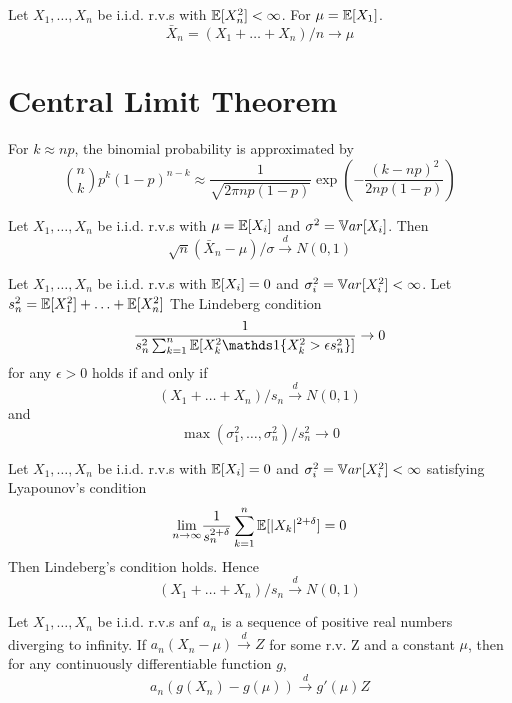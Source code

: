 \documentclass[11pt]{article}
\begin{document}
\theorem
Let $X_1, \hdots, X_n$ be i.i.d. r.v.s with $\mathbb{E}[{X_n^2}] < \infty$. For $\mu = \mathbb{E}[{X_1}]$. $$\bar{X}_n = (X_1 + \hdots + X_n) / n \rightarrow \mu$$ 

\section{Central Limit Theorem}
For $k \approx np$, the binomial probability is approximated by
$${n \choose k}p^k(1-p)^{n-k} \approx \frac{1}{\sqrt{2\pi np(1-p)}}\exp{\left ( - \frac{(k - np)^2}{2np(1-p)}\right)}$$

Let $X_1, \hdots, X_n$ be i.i.d. r.v.s with $\mu = \mathbb{E}[{X_i}]$ and $\sigma^2 = \mathbb{V}ar[{X_i}]$. Then
$$\sqrt{n}(\bar{X}_n - \mu) / \sigma \overset{d}{\longrightarrow} N(0,1)$$

Let $X_1, \hdots, X_n$ be i.i.d. r.v.s with $\mathbb{E}[{X_i}] = 0$ and $\sigma_i^2 = \mathbb{V}ar[{X_i^2}] < \infty$. Let $s_n^2 = \mathbb{E}[{X_1^2}] + \hdots + \mathbb{E}[{X_n^2}]$ The Lindeberg condition
$$\frac{1}{s_n^2 \sum_{k=1}^n \expect{X_k^2\id{X_k^2 > \epsilon s_n^2}}} \rightarrow 0$$ for any $\epsilon > 0$ holds if and only if
$$(X_1 + \hdots + X_n) /s_n \overset{d}{\longrightarrow} N(0,1)$$ and $$\max(\sigma_1^2, \hdots, \sigma_n^2)/ s_n^2 \rightarrow 0$$

Let $X_1, \hdots, X_n$ be i.i.d. r.v.s with $\mathbb{E}[{X_i}] = 0$ and $\sigma_i^2 = \mathbb{V}ar[{X_i^2}] < \infty$ satisfying Lyapounov's condition
$$\underset{n \rightarrow \infty}{\lim} \frac{1}{s_n^{2 + \delta}} \sum_{k=1}^n \mathbb{E}[{|X_k|^{2 + \delta}}] = 0$$
Then Lindeberg's condition holds. Hence $$(X_1 + \hdots + X_n) /s_n \overset{d}{\longrightarrow} N(0,1)$$


Let $X_1, \hdots, X_n$ be i.i.d. r.v.s anf $a_n$ is a sequence of positive real numbers diverging to infinity. If $a_n(X_n - \mu) \overset{d}{\longrightarrow} Z$ for some r.v. Z and a constant $\mu$, then for any continuously differentiable function $g$,
$$a_n(g(X_n) - g(\mu)) \overset{d}{\longrightarrow} g'(\mu)Z$$
\end{document}
